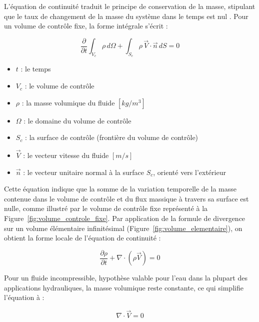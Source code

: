 L'équation de continuité traduit le principe de conservation de la masse, stipulant que le taux de changement de la masse du système dans le temps est nul \cite{batchelor1967introduction}. Pour un volume de contrôle fixe, la forme intégrale s'écrit :

\begin{equation}
\frac{\partial}{\partial t} \int_{V_c} \rho \, d\Omega + \int_{S_c} \rho \, \vec{V} \cdot \vec{n} \, dS = 0
\label{eq:continuite_integrale}
\end{equation}
\begin{itemize}
    \item[--] \(t\) : le temps
    \item[--] \(V_c\) : le volume de contrôle
    \item[--] \(\rho\) : la masse volumique du fluide \([kg/m^3]\)
    \item[--] \(\Omega\) : le domaine du volume de contrôle
    \item[--] \(S_c\) : la surface de contrôle (frontière du volume de contrôle)
    \item[--] \(\vec{V}\) : le vecteur vitesse du fluide \([m/s]\)
    \item[--] \(\vec{n}\) : le vecteur unitaire normal à la surface \(S_c\), orienté vers l'extérieur
\end{itemize}

Cette équation indique que la somme de la variation temporelle de la masse contenue dans le volume de contrôle et du flux massique à travers sa surface est nulle, comme illustré par le volume de contrôle fixe représenté à la Figure~\ref{fig:volume_controle_fixe}. Par application de la formule de divergence sur un volume élémentaire infinitésimal (Figure~\ref{fig:volume_elementaire}), on obtient la forme locale de l'équation de continuité : \cite{panton2013incompressible}

\begin{equation}
\frac{\partial \rho}{\partial t} + \nabla \cdot (\rho \vec{V}) = 0
\label{eq:continuite_locale}
\end{equation}

Pour un fluide incompressible, hypothèse valable pour l'eau dans la plupart des applications hydrauliques, la masse volumique reste constante, ce qui simplifie l'équation à :

\begin{equation}
\nabla \cdot \vec{V} = 0
\label{eq:continuite_incompressible}
\end{equation}

